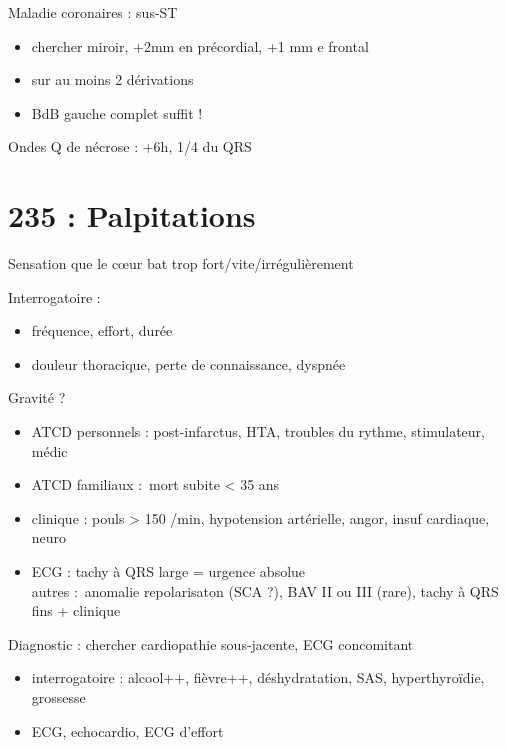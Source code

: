 \documentclass{article}
\begin{document}
Maladie coronaires : sus-ST
\begin{itemize}
  \item chercher miroir, +2mm en précordial, +1 mm e frontal
  \item sur au moins 2 dérivations
  \item BdB gauche complet suffit !
\end{itemize}
Ondes Q de nécrose : +6h, 1/4 du QRS

\section{235 : Palpitations}%
\label{sec:235_palpitations}
Sensation que le c\oe{}ur bat trop fort/vite/irrégulièrement

Interrogatoire : 
\begin{itemize}
  \item fréquence, effort, durée
  \item \danger{} douleur thoracique, perte de connaissance, dyspnée
\end{itemize}
Gravité ?
\begin{itemize}
  \item ATCD personnels : post-infarctus, HTA, troubles du rythme, stimulateur,
    médic
  \item ATCD familiaux : mort subite < 35 ans
  \item clinique : pouls > 150 /min, hypotension artérielle, angor, insuf
    cardiaque, neuro
  \item ECG : tachy à QRS large = urgence absolue \skull\\
    autres : anomalie repolarisaton (SCA ?), BAV II ou III (rare), tachy à QRS
    fins + clinique
\end{itemize}
Diagnostic : chercher cardiopathie sous-jacente, ECG concomitant
\begin{itemize}
  \item interrogatoire : alcool++, fièvre++, déshydratation, SAS,
    hyperthyroïdie, grossesse
  \item ECG, echocardio, ECG d'effort
\end{itemize}
\end{document}
